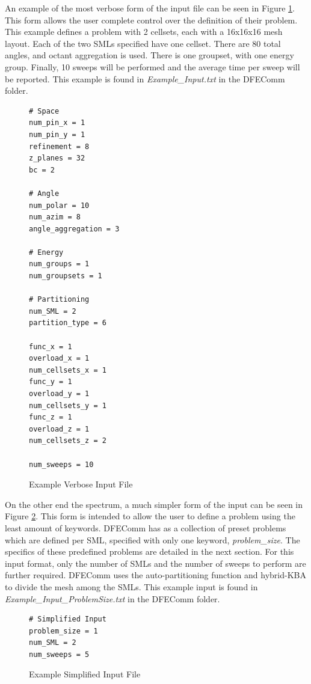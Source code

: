 \documentclass{article}
\begin{document}
An example of the most verbose form of the input file can be seen in Figure \ref{fig::verbose}. This form allows the user complete control over the definition of their problem. This example defines a problem with 2 cellsets, each with a 16x16x16 mesh layout. Each of the two SMLs specified have one cellset. There are 80 total angles, and octant aggregation is used. There is one groupset, with one energy group. Finally, 10 sweeps will be performed and the average time per sweep will be reported. This example is found in \emph{Example\_Input.txt} in the DFEComm folder.\\
\begin{figure}[H]
\begin{verbatim}
# Space
num_pin_x = 1
num_pin_y = 1
refinement = 8
z_planes = 32
bc = 2

# Angle
num_polar = 10
num_azim = 8
angle_aggregation = 3

# Energy
num_groups = 1
num_groupsets = 1
  	
# Partitioning
num_SML = 2
partition_type = 6
  	
func_x = 1
overload_x = 1
num_cellsets_x = 1
func_y = 1
overload_y = 1
num_cellsets_y = 1
func_z = 1
overload_z = 1
num_cellsets_z = 2

num_sweeps = 10
\end{verbatim}
  \caption[]{Example Verbose Input File}\label{fig::verbose}
\end{figure}

On the other end the spectrum, a much simpler form of the input can be seen in Figure \ref{fig::simplified}. This form is intended to allow the user to define a problem using the least amount of keywords. DFEComm has as a collection of preset problems which are defined per SML, specified with only one keyword, \emph{problem\_size}. The specifics of these predefined problems are detailed in the next section. For this input format, only the number of SMLs and the number of sweeps to perform are further required. DFEComm uses the auto-partitioning function and hybrid-KBA to divide the mesh among the SMLs. This example input is found in \emph{Example\_Input\_ProblemSize.txt} in the DFEComm folder.\\

\begin{figure}[H]
\begin{verbatim}
# Simplified Input
problem_size = 1
num_SML = 2
num_sweeps = 5
\end{verbatim}  
    \caption[]{Example Simplified Input File}\label{fig::simplified}
\end{figure}
\end{document}
